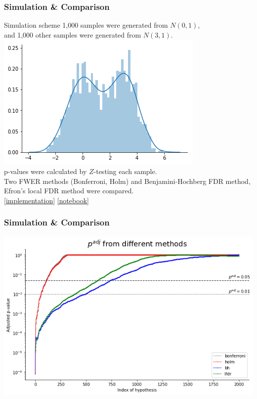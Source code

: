 \documentclass{beamer}
\begin{document}
\frame
{
    \frametitle{\LARGE Simulation \& Comparison}
    \normalsize
    \begin{block}{Simulation scheme}
    1,000 samples were generated from $N(0, 1)$, \\and 1,000 other samples were generated from $N(3, 1)$\vspace{0.12in}.\\
    
    \includegraphics[scale=0.3]{samples}\\
    p-values were calculated by $Z$-testing each sample. \vspace{0.2in}\\
    
    Two FWER methods (Bonferroni, Holm) and Benjamini-Hochberg FDR method, Efron's local FDR method were compared.\vspace{0.05in}\\
    \href{https://gist.github.com/naturale0/3915e2def589553e91dce99e69d138cc\#file-mcpconverter-py}{[implementation]} 
     \href{https://gist.github.com/naturale0/3915e2def589553e91dce99e69d138cc\#file-mcp_simulation-ipynb}{[notebook]}
    
    \end{block}
}


\frame
{
    \frametitle{\LARGE Simulation \& Comparison}
    \normalsize
    \includegraphics[scale=0.5]{adj_pval}
}
\end{document}

